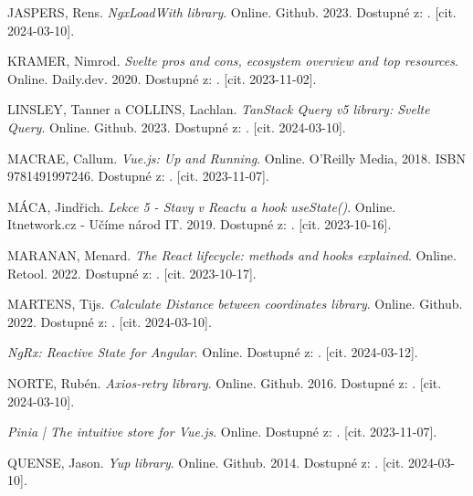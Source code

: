 \begin{thebibliography}{99}
\textsc{JASPERS}, Rens. \emph{NgxLoadWith library}. Online. Github. 2023. Dostupné z: . [cit. 2024-03-10].

\textsc{KRAMER}, Nimrod. \emph{Svelte pros and cons, ecosystem overview and top resources}. Online. Daily.dev. 2020. Dostupné z: . [cit. 2023-11-02].

\textsc{LINSLEY}, Tanner a \textsc{COLLINS}, Lachlan. \emph{TanStack Query v5 library: Svelte Query}. Online. Github. 2023. Dostupné z: . [cit. 2024-03-10].

\textsc{MACRAE}, Callum. \emph{Vue.js: Up and Running}. Online. O'Reilly Media, 2018. ISBN 9781491997246. Dostupné z: . [cit. 2023-11-07].

\textsc{MÁCA}, Jindřich. \emph{Lekce 5 - Stavy v Reactu a hook useState()}. Online. Itnetwork.cz - Učíme národ IT. 2019. Dostupné z: . [cit. 2023-10-16].

\textsc{MARANAN}, Menard. \emph{The React lifecycle: methods and hooks explained}. Online. Retool. 2022. Dostupné z: . [cit. 2023-10-17].

\textsc{MARTENS}, Tijs. \emph{Calculate Distance between coordinates library}. Online. Github. 2022. Dostupné z: . [cit. 2024-03-10].

\emph{NgRx: Reactive State for Angular}. Online. Dostupné z: . [cit. 2024-03-12].

\textsc{NORTE}, Rubén. \emph{Axios-retry library}. Online. Github. 2016. Dostupné z: . [cit. 2024-03-10].

\emph{Pinia | The intuitive store for Vue.js}. Online. Dostupné z: . [cit. 2023-11-07].

\textsc{QUENSE}, Jason. \emph{Yup library}. Online. Github. 2014. Dostupné z: . [cit. 2024-03-10].


\end{thebibliography}
